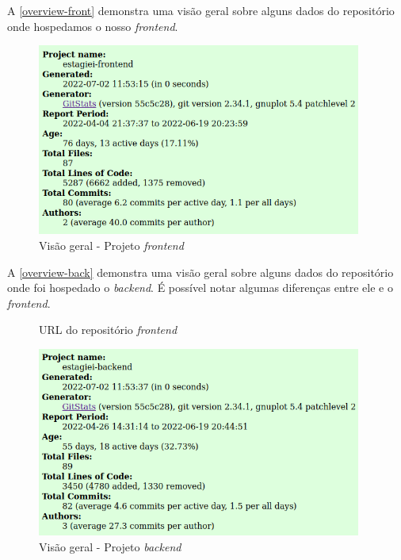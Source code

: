 A \autoref{overview-front} demonstra uma visão geral sobre alguns dados do repositório onde hospedamos o nosso \textit{\gls{frontend}}.

\begin{figure}[H]
	\centering
	\caption{\label{overview-front}Visão geral - Projeto \textit{\gls{frontend}}}
	\includegraphics[width=0.95\textwidth]{../imagens/stats/overview-frontend.png}
\end{figure}

A \autoref{overview-back} demonstra uma visão geral sobre alguns dados do repositório onde foi hospedado o \textit{\gls{backend}}. É possível notar algumas diferenças entre ele e o \textit{\gls{frontend}}.

\begin{figure}[htb]
	\caption{\label{qr-url-front}URL do repositório \textit{\gls{frontend}}}
	\begin{center}
	\end{center}
\end{figure}

\begin{figure}[H]
	\centering
	\caption{\label{overview-back}Visão geral - Projeto \textit{\gls{backend}}}
	\includegraphics[width=0.95\textwidth]{../imagens/stats/overview-backend.png}
\end{figure}

